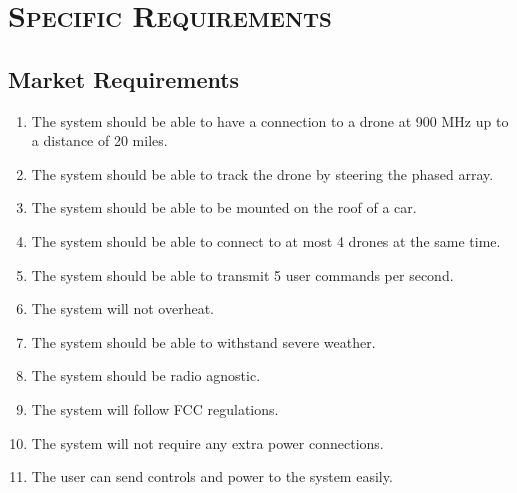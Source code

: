 \documentclass[ProductRequirements.tex]{subfiles}
\begin{document}
\bigskip
\pagebreak
\section{\textsc{\Large Specific Requirements}}
	\subsection{Market Requirements}
	\begin{enumerate}%
		\item The system should be able to have a connection to a drone at 900 MHz up to a distance of 20 miles.
		\item The system should be able to track the drone by steering the phased array.
		\item The system should be able to be mounted on the roof of a car.
		\item The system should be able to connect to at most 4 drones at the same time.
		\item The system should be able to transmit 5 user commands per second.
		\item The system will not overheat.
		\item The system should be able to withstand severe weather.
		\item The system should be radio agnostic.
		\item The system will follow FCC regulations.
		\item The system will not require any extra power connections.
		\item The user can send controls and power to the system easily.
	\end{enumerate}
\end{document}
